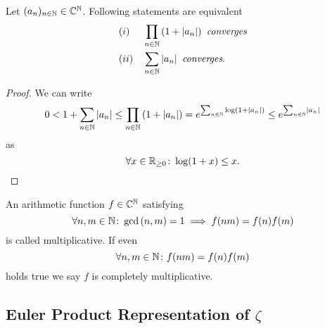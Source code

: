 \begin{lemma}
	Let $(a_n)_{n \in \mathbb{N}} \in \mathbb{C}^{\mathbb{N}}$. Following statements are equivalent
\begin{equation*}
\begin{aligned}
	&(i) &&\prod_{n \in \mathbb{N}} \left(1 + \left|a_n\right|\right) \textit{ converges} \\
	&(ii) &&\sum_{n \in \mathbb{N}} \left|a_n\right| \textit{ converges}.
\end{aligned}
\end{equation*}
\end{lemma}
\begin{proof}
	We can write
\begin{equation*}
	0 < 1 + \sum_{n \in \mathbb{N}} \left|a_n\right| \leq \prod_{n \in \mathbb{N}} \left(1 + \left|a_n\right|\right) = e^{\sum_{n \in \mathbb{N}} \log(1 + \left|a_n\right|)} \leq e^{\sum_{n \in \mathbb{N}} \left|a_n\right|}
\end{equation*}
	as
\begin{equation*}
	\forall x \in \mathbb{R}_{\geq 0} \colon \log(1 + x) \leq x.
\end{equation*}
\end{proof}


\begin{definition}
	An arithmetic function $f \in \mathbb{C}^{\mathbb{N}}$ satisfying
\begin{equation*}
	\forall n,m \in \mathbb{N} \colon \gcd\left(n, m\right) = 1 \implies f(n m) = f(n) f(m)
\end{equation*}
	is called multiplicative. If even
\begin{equation*}
	\forall n,m \in \mathbb{N} \colon f(n m) = f(n) f(m)
\end{equation*}
	holds true we say $f$ is completely multiplicative.
\end{definition}


\subsection{Euler Product Representation of $\zeta$}


